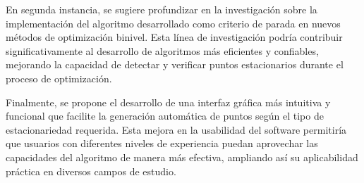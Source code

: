 \begin{conclusions}
En segunda instancia, se sugiere profundizar en la investigación sobre la implementación del algoritmo desarrollado como criterio de parada en nuevos métodos de optimización binivel. Esta línea de investigación podría contribuir significativamente al desarrollo de algoritmos más eficientes y confiables, mejorando la capacidad de detectar y verificar puntos estacionarios durante el proceso de optimización.

Finalmente, se propone el desarrollo de una interfaz gráfica más intuitiva y funcional que facilite la generación automática de puntos según el tipo de estacionariedad requerida. Esta mejora en la usabilidad del software permitiría que usuarios con diferentes niveles de experiencia puedan aprovechar las capacidades del algoritmo de manera más efectiva, ampliando así su aplicabilidad práctica en diversos campos de estudio.
        
\end{conclusions}
